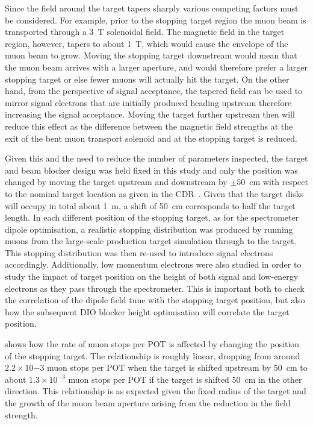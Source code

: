 Since the field around the target tapers sharply various competing factors must be considered.
For example, prior to the stopping target region the muon beam is transported through a 3~T solenoidal field.
The magnetic field in the target region, however, tapers to about 1~T, which would cause the envelope of the muon beam to grow.
Moving the stopping target downstream would mean that the muon beam arrives with a larger aperture, and would therefore prefer a larger stopping target or else fewer muons will actually hit the target.
On the other hand, from the perspective of signal acceptance, the tapered field can be used to mirror signal electrons that are initially produced heading upstream therefore increasing the signal acceptance.
Moving the target further upstream then will reduce this effect as the difference between the magnetic field strengths at the exit of the bent muon transport solenoid and at the stopping target is reduced.

Given this and the need to reduce the number of parameters inspected, the target and beam blocker design was held fixed in this study and only the position was changed by moving the target upstream and downstream by $\pm50$~cm with respect to the nominal target location as given in the CDR~\cite{CDRphase2}.
Given that the target disks will occupy in total about 1~m, a shift of 50~cm corresponds to half the target length.
In each different position of the stopping target, as for the spectrometer dipole optimisation, a realistic stopping distribution was produced by running muons from the large-scale production target simulation through to the target.
This stopping distribution was then re-used to introduce signal electrons accordingly.
Additionally, low momentum electrons were also studied in order to study the impact of target position on the height of both signal and low-energy electrons as they pass through the spectrometer.
This is important both to check the correlation of the dipole field tune with the stopping target position, but also how the subsequent DIO blocker height optimisation will correlate the target position.
\FigOptimStopTgtPosMuStops

 shows how the rate of muon stops per \ac{POT} is affected by changing the position of the stopping target.
The relationship is roughly linear, dropping from around $2.2\times10{-3}$ muon stops per POT when the target is shifted upstream by 50~cm to about $1.3\times10^{-3}$ muon stops per POT if the target is shifted 50~cm in the other direction.
This relationship is as expected given the fixed radius of the target and the growth of the muon beam aperture arising from the reduction in the field strength.

